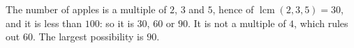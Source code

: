The number of apples is a multiple of $2$, $3$ and $5$, hence of $\operatorname{lcm}(2,3,5)=30$, and it is less than $100$: so it is $30$, $60$ or $90$. It is not a multiple of $4$, which rules out $60$. The largest possibility is $\boxed{90}$.
